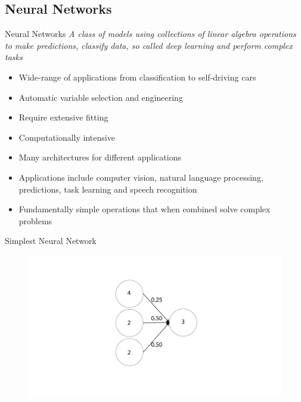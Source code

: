\documentclass[10pt]{beamer}
\begin{document}
\subsection{Neural Networks}
\begin{frame}{Neural Networks}
\emph{A class of models using collections of linear algebra operations to make predictions, classify data, so called deep learning and perform complex tasks}
	\begin{itemize}
		\item Wide-range of applications from classification to self-driving cars
		\item Automatic variable selection and engineering
		\item Require extensive fitting 
		\item Computationally intensive
		\item \alert{Many} architectures for different applications
		\item Applications include computer vision, natural language processing, predictions, task learning and speech recognition
		\item Fundamentally simple operations that when combined solve complex problems
	\end{itemize}
\end{frame}

\begin{frame}{Simplest Neural Network}
		\begin{figure}	
			\includegraphics[width=1.5\textwidth, center, trim=0cm 0cm 0 0cm]{images/No_hidden_NN.pdf}
	\end{figure}
\end{frame}
\end{document}
